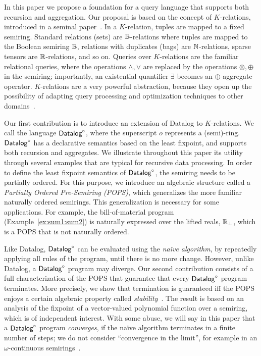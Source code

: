 In this paper we propose a foundation for a query language that
supports both recursion and aggregation.  Our proposal is based on the
concept of $K$-relations, introduced in a seminal
paper~\cite{DBLP:conf/pods/GreenKT07}.  In a $K$-relation, tuples are
mapped to a fixed semiring. Standard relations (sets) are
$\mathbb B$-relations where tuples are mapped to the Boolean semiring $\mathbb B$,
relations with duplicates (bags) are $\mathbb N$-relations, sparse tensors
are $\mathbb R$-relations, and so on.  Queries over $K$-relations are the
familiar relational queries, where the operations $\wedge, \vee$ are
replaced by the operations $\otimes, \oplus$ in the semiring;
importantly, an existential quantifier $\exists$ becomes an
$\oplus$-aggregate operator.
$K$-relations are a very powerful abstraction, because they open up
the possibility of adapting query processing and optimization
techniques to other domains~\cite{DBLP:conf/pods/KhamisNR16}.

Our first contribution is to introduce an extension of Datalog to
$K$-relations.  We call the language $\text{\sf Datalog}^\circ$, where the superscript
$o$ represents a (semi)-ring.  $\text{\sf Datalog}^\circ$ has a declarative semantics
based on the least fixpoint, and supports both recursion and
aggregates.  We illustrate throughout this paper its utility through
several examples that are typical for recursive data processing.  In
order to define the least fixpoint semantics of $\text{\sf Datalog}^\circ$, the semiring
needs to be partially ordered.  For this purpose, we introduce an
algebraic structure called a {\em Partially Ordered Pre-Semiring (POPS)\/},
which generalizes the more familiar naturally ordered semirings.  This
generalization is necessary for some applications.  For example, the
bill-of-material program (Example~\ref{ex:sum1:sum2}) is naturally
expressed over the lifted reals, $\mathbb R_\bot$, which is a POPS that is
not naturally ordered.

Like Datalog, $\text{\sf Datalog}^\circ$ can be evaluated using the {\em na\"ive algorithm},
by repeatedly applying all rules of the program, until there is no
more change.  However, unlike Datalog, a $\text{\sf Datalog}^\circ$ program may diverge.
Our second contribution consists of a full characterization of the
POPS that guarantee that every $\text{\sf Datalog}^\circ$ program terminates.  More
precisely, we show that termination is guaranteed iff the POPS enjoys
a certain algebraic property called {\em
  stability}~\cite{semiring_book}.  The result is based on an analysis
of the fixpoint of a vector-valued polynomial function over a semiring, which is of
independent interest.  With some abuse, we will say in this paper that
a $\text{\sf Datalog}^\circ$ program {\em converges}, if the na\"ive algorithm terminates
in a finite number of steps; we do not consider ``convergence in the
limit'', for example in an $\omega$-continuous
semirings~\cite{DBLP:conf/pods/GreenKT07,DBLP:journals/jacm/EsparzaKL10}.

